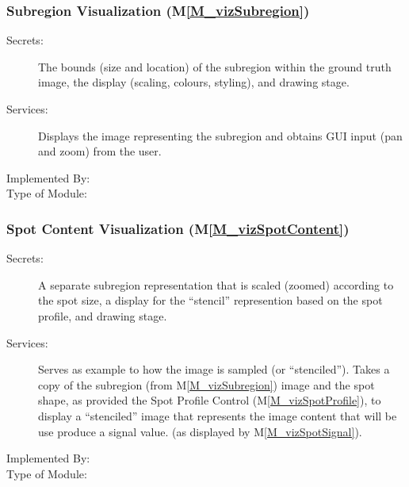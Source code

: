 \documentclass[12pt, titlepage]{article}
\newcommand{\mref}[1]{M\ref{#1}}
\begin{document}
\subsubsection{Subregion Visualization (\mref{M_vizSubregion})}
\begin{description}
\item[Secrets:]The bounds (size and location) of the subregion within the ground truth image,
  the display (scaling, colours, styling), and drawing stage.
\item[Services:]Displays the image representing the subregion and obtains GUI
  input (pan and zoom) from the user.
\item[Implemented By:] \progname{}
\item[Type of Module:] 
\end{description}


\subsubsection{Spot Content Visualization (\mref{M_vizSpotContent})}
\begin{description}
\item[Secrets:]A separate subregion representation that is scaled (zoomed) according to
  the spot size, a display for the ``stencil'' represention based on the spot profile,
  and drawing stage.
\item[Services:]Serves as example to how the image is sampled (or ``stenciled'').
  Takes a copy of the subregion (from \mref{M_vizSubregion}) image and the spot shape, 
  as provided the Spot Profile Control (\mref{M_vizSpotProfile}), to display a ``stenciled'' image
  that represents the image content that will be use produce a signal value.
  (as displayed by \mref{M_vizSpotSignal}).
\item[Implemented By:] \progname{}
\item[Type of Module:] 
\end{description}
\end{document}
